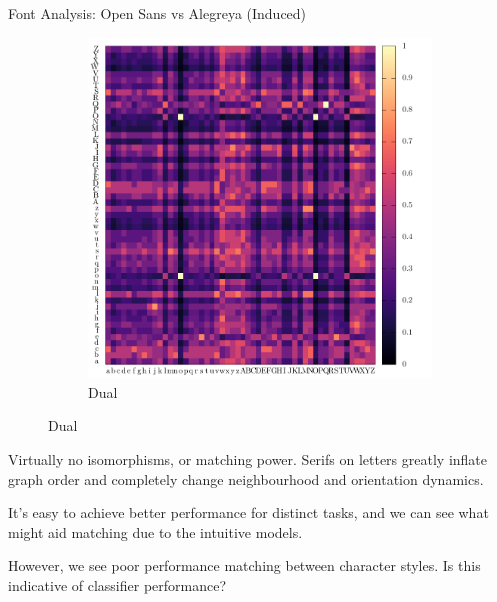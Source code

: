 \documentclass[10pt]{beamer}
\begin{document}
\begin{frame}{Font Analysis: Open Sans vs Alegreya (Induced)}
\begin{figure}
\begin{subfigure}[b]{0.4\linewidth}
			\includegraphics[width=\linewidth, height=0.9\linewidth]{../tables/dual-alegreya-dejavu-sans/induced-conf-nrm.pdf}
			\caption{
				Dual
			}
		\end{subfigure}
	\end{figure}
	
	Virtually no isomorphisms, or matching power.
	Serifs on letters greatly inflate graph order and completely change neighbourhood and orientation dynamics.
\end{frame}

\begin{frame}[standout]
	It's \alert{easy to achieve better performance for distinct tasks}, and we can see what might aid matching due to the intuitive models.
	
	However, we see \alert{poor performance matching between character styles}.
	Is this indicative of classifier performance?
\end{frame}
\end{document}
